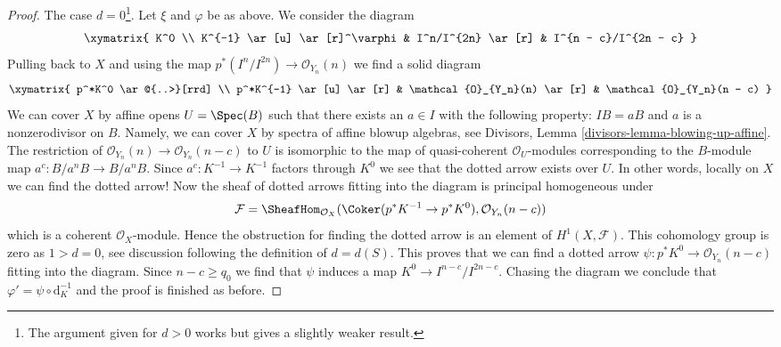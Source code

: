 \begin{proof}
\medskip\noindent
The case $d = 0$\footnote{The argument given for $d > 0$ works but gives
a slightly weaker result.}. Let $\xi$ and $\varphi$ be as above.
We consider the diagram
$$
\xymatrix{
K^0 \\
K^{-1} \ar[u] \ar[r]^\varphi & I^n/I^{2n} \ar[r] & I^{n - c}/I^{2n - c}
}
$$
Pulling back to $X$ and using the map
$p^*(I^n/I^{2n}) \to \mathcal{O}_{Y_n}(n)$
we find a solid diagram
$$
\xymatrix{
p^*K^0 \ar@{..>}[rrd] \\
p^*K^{-1} \ar[u] \ar[r] &
\mathcal{O}_{Y_n}(n) \ar[r] &
\mathcal{O}_{Y_n}(n - c)
}
$$
We can cover $X$ by affine opens $U = \Spec(B)$ such that there
exists an $a \in I$ with the following property: $IB = aB$
and $a$ is a nonzerodivisor on $B$. Namely, we can cover
$X$ by spectra of affine blowup algebras, see
Divisors, Lemma \ref{divisors-lemma-blowing-up-affine}.
The restriction of $\mathcal{O}_{Y_n}(n) \to \mathcal{O}_{Y_n}(n - c)$
to $U$ is isomorphic to the map of quasi-coherent $\mathcal{O}_U$-modules
corresponding to the $B$-module map $a^c : B/a^nB \to B/a^nB$.
Since $a^c : K^{-1} \to K^{-1}$ factors through $K^0$ we see that
the dotted arrow exists over $U$. In other words,
locally on $X$ we can find the dotted arrow! Now the sheaf of dotted
arrows fitting into the diagram is principal homogeneous under
$$
\mathcal{F} = \SheafHom_{\mathcal{O}_X}(
\Coker(p^*K^{-1} \to p^*K^0), \mathcal{O}_{Y_n}(n - c))
$$
which is a coherent $\mathcal{O}_X$-module.
Hence the obstruction for finding the dotted arrow is an element
of $H^1(X, \mathcal{F})$. This cohomology group is zero as
$1 > d = 0$, see discussion following the definition of $d = d(S)$.
This proves that we can find a dotted arrow
$\psi : p^*K^0 \to \mathcal{O}_{Y_n}(n - c)$
fitting into the diagram. Since $n - c \geq q_0$
we find that $\psi$ induces a map $K^0 \to I^{n - c}/I^{2n - c}$.
Chasing the diagram we conclude that $\varphi' = \psi \circ \text{d}_K^{-1}$
and the proof is finished as before.
\end{proof}












